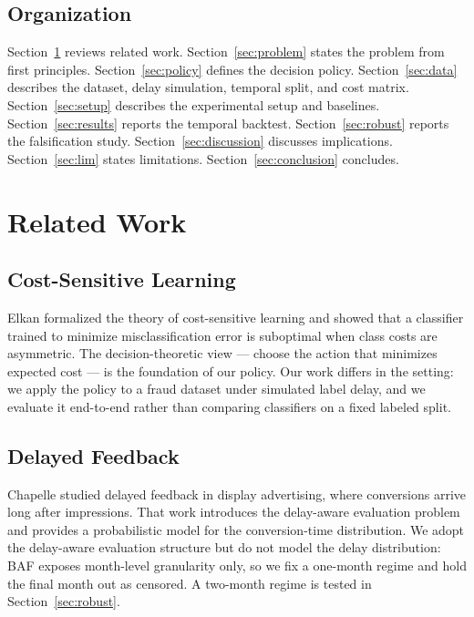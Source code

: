 \documentclass[conference]{IEEEtran}
\begin{document}
\subsection{Organization}

Section~\ref{sec:related} reviews related work. Section~\ref{sec:problem}
states the problem from first principles. Section~\ref{sec:policy} defines
the decision policy. Section~\ref{sec:data} describes the dataset,
delay simulation, temporal split, and cost matrix.
Section~\ref{sec:setup} describes the experimental setup and baselines.
Section~\ref{sec:results} reports the temporal backtest.
Section~\ref{sec:robust} reports the falsification study.
Section~\ref{sec:discussion} discusses implications. Section~\ref{sec:lim}
states limitations. Section~\ref{sec:conclusion} concludes.

\section{Related Work}
\label{sec:related}

\subsection{Cost-Sensitive Learning}

Elkan \cite{elkan2001} formalized the theory of cost-sensitive learning and
showed that a classifier trained to minimize misclassification error is
suboptimal when class costs are asymmetric. The decision-theoretic view ---
choose the action that minimizes expected cost --- is the foundation of our
policy. Our work differs in the setting: we apply the policy to a fraud
dataset under simulated label delay, and we evaluate it end-to-end rather
than comparing classifiers on a fixed labeled split.

\subsection{Delayed Feedback}

Chapelle \cite{chapelle2014} studied delayed feedback in display
advertising, where conversions arrive long after impressions. That work
introduces the delay-aware evaluation problem and provides a probabilistic
model for the conversion-time distribution. We adopt the delay-aware
evaluation structure but do not model the delay distribution: BAF exposes
month-level granularity only, so we fix a one-month regime and hold the
final month out as censored. A two-month regime is tested in
Section~\ref{sec:robust}.
\end{document}
